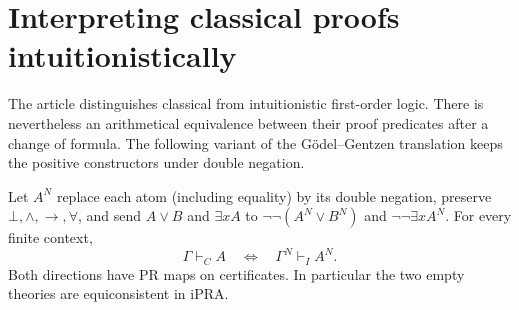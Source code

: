 \section{Interpreting classical proofs intuitionistically}\label{sec:negative}
The article distinguishes classical from intuitionistic first-order logic. There is nevertheless an arithmetical equivalence between their proof predicates after a change of formula. The following variant of the Gödel--Gentzen translation keeps the positive constructors under double negation.

\begin{theorem}\label{thm:negative}
Let $A^N$ replace each atom (including equality) by its double negation, preserve $\bot,\wedge,\to,\forall$, and send $A\vee B$ and $\exists x A$ to $\neg\neg(A^N\vee B^N)$ and $\neg\neg\exists x A^N$. For every finite context,
\[
             \Gamma\vdash_C A\quad\Longleftrightarrow\quad
             \Gamma^N\vdash_I A^N .
\]
Both directions have PR maps on certificates. In particular the two empty theories are equiconsistent in iPRA.
\end{theorem}
